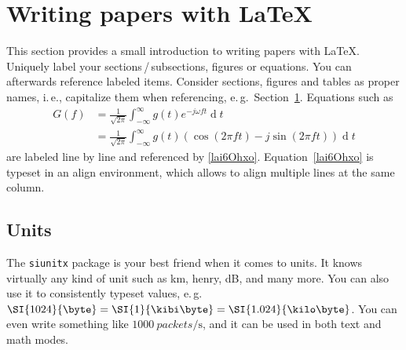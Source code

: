 \section{Writing papers with \LaTeX}\label{cheiThu4}
This section provides a small introduction to writing papers with \LaTeX{}.
Uniquely label your sections\,/\,subsections, figures or equations.
You can afterwards reference labeled items.
Consider sections, figures and tables as proper names, i.\,e., capitalize them
when referencing, e.\,g.\ Section~\ref{cheiThu4}.
Equations such as
\begin{align}
	\nonumber G(f) &= \frac{1}{\sqrt{2\pi}}\int_{-\infty}^{\infty}
	g(t)e^{-j\omega ft} \operatorname dt\\
	&= \frac{1}{\sqrt{2\pi}}\int_{-\infty}^{\infty} g(t) \left (\cos(2\pi f t)
	-j\sin(2\pi ft) \right ) \operatorname dt
	\label{lai6Ohxo}
\end{align}
are labeled line by line and referenced by \eqref{lai6Ohxo}.
Equation~\eqref{lai6Ohxo} is typeset in an align environment, which allows to
align multiple lines at the same column.


\subsection{Units}
The \texttt{siunitx} package is your best friend when it comes to units.
It knows virtually any kind of unit such as \si{\kilo\meter}, \si{henry},
\si{\deci\bel}, and many more.
You can also use it to consistently typeset values, e.\,g.\ $\SI{1024}{\byte} =
\SI{1}{\kibi\byte} = \SI{1.024}{\kilo\byte}$.
You can even write something like $\SI{1000}{packets\per\second}$, and it can
be used in both text and math modes.

